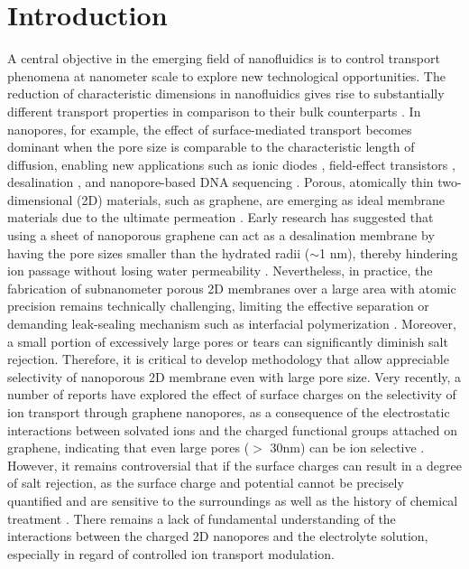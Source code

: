 \documentclass[journal=nalefd,email=true, hyperref=true, keywords=false]{achemso}
\begin{document}
\section{Introduction}
\label{sec:intro}
A central objective in the emerging field of nanofluidics is to
control transport phenomena at nanometer scale to explore new
technological opportunities. The reduction of characteristic
dimensions in nanofluidics gives rise to substantially different
transport properties in comparison to their bulk counterparts
\cite{Schoch_2008}. In nanopores, for example, the effect of
surface-mediated transport becomes dominant when the pore size is
comparable to the characteristic length of diffusion, enabling new
applications such as ionic diodes
\cite{Karnik_2007,siwy2002fabrication,vlassiouk2007nanofluidic},
field-effect transistors \cite{Nam_2009}, desalination
\cite{Heiranian_2015}, and nanopore-based DNA sequencing
\cite{Heerema_2016,Garaj_2013}. Porous, atomically thin
two-dimensional (2D) materials, such as graphene, are emerging as
ideal membrane materials due to the ultimate permeation
\cite{Suk_2010,Jiang_2009,Celebi_2014,Koenig_2012,Drahushuk_2012}. Early
research has suggested that using a sheet of nanoporous graphene can
act as a desalination membrane by having the pore sizes smaller than
the hydrated radii ($\sim$1 nm), thereby hindering ion passage without
losing water permeability
\cite{Cohen_Tanugi_2012,Suk_2014,Cohen_Tanugi_2014,Cohen_Tanugi_2015,O_Hern_2014,O_Hern_2015,Surwade_2015,Walker_2017,Ghosh_2018}.
Nevertheless, in practice, the fabrication of subnanometer porous 2D
membranes over a large area with atomic precision remains technically
challenging, { limiting the effective separation or demanding
  leak-sealing mechanism such as interfacial polymerization}
\cite{Suk_2014,Rollings_2016,O_Hern_2012,Wang_2017}. Moreover, a small
portion of excessively large pores or tears can significantly diminish
salt rejection. Therefore, it is critical to develop methodology that
allow appreciable selectivity of nanoporous 2D membrane even with
large pore size. Very recently, a number of reports have explored the
effect of surface charges on the selectivity of ion transport through
graphene nanopores, as a consequence of the electrostatic interactions
between solvated ions and the charged functional groups attached on
graphene, indicating that even large pores ($>$ 30nm) can be ion
selective \cite{Rollings_2016,Surwade_2014}. However, it remains
controversial that if the surface charges can result in a degree of
salt rejection, as the surface charge and potential cannot be
precisely quantified and are sensitive to the surroundings as well as
the history of chemical treatment \cite{Li_2008}. There remains a lack
of fundamental understanding of the interactions between the charged
2D nanopores and the electrolyte solution, { especially in regard of controlled ion transport modulation}. 
\end{document}
